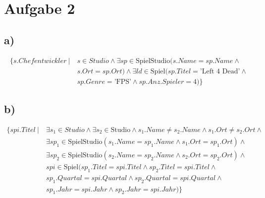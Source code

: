 \pagebreak
\section*{Aufgabe 2}
\subsection*{a)}
\begin{align*}
  \{ s.Chefentwickler\ |\ &s \in Studio \land \exists sp \in \text{SpielStudio}(s.Name = sp.Name \land \\
                          &s.Ort = sp.Ort)\land \exists ld \in \text{Spiel}(sp.Titel = \text{'Left 4 Dead'} \land \\
                          &sp.Genre = \text{'FPS'} \land sp.Anz.Spieler = 4) \}
\end{align*}
\subsection*{b)}
\begin{align*}
  \{ spi.Titel\ |\ &\exists s_1 \in Studio \land \exists s_2 \in \text{Studio} \land s_1.Name \not = s_2.Name \land s_1.Ort \not = s_2.Ort \land \\
                   &\exists sp_1 \in \text{SpielStudio}(s_1.Name = sp_1.Name \land s_1.Ort = sp_1.Ort)\land \\
                   &\exists sp_2 \in \text{SpielStudio}(s_2.Name = sp_2.Name \land s_2.Ort = sp_2.Ort)\land \\
                   &spi \in \text{Spiel}(sp_1.Titel = spi.Titel \land sp_2.Titel = spi.Titel \land \\
                   &sp_1.Quartal = spi.Quartal \land sp_2.Quartal = spi.Quartal \land \\
                   &sp_1.Jahr = spi.Jahr \land sp_2.Jahr = spi.Jahr)\}
\end{align*}
